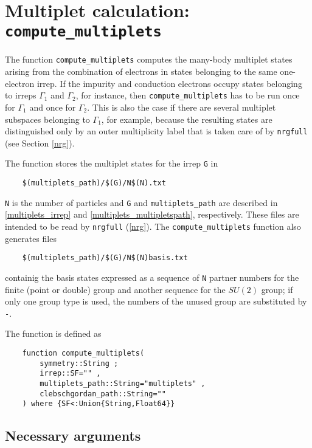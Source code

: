 \documentclass[notitlepage]{article}
\begin{document}
\section{Multiplet calculation: \texttt{compute\_multiplets}}
\label{multiplet_calculation}
The function \texttt{compute\_multiplets} computes the
many-body multiplet states arising from the combination of
electrons in states belonging to the same one-electron
irrep. If the impurity and conduction electrons occupy
states belonging to irreps $\Gamma_1$ and $\Gamma_2$, for
instance, then \texttt{compute\_multiplets} has to be run
once for $\Gamma_1$ and once for $\Gamma_2$. This is also
the case if there are several multiplet subspaces belonging
to $\Gamma_1$, for example, because the resulting states are
distinguished only by an outer multiplicity label that is
taken care of by \texttt{nrgfull} (see Section \ref{nrg}).
\par
The function stores the multiplet states for the irrep
\texttt{G} in
\begin{verbatim}
    $(multiplets_path)/$(G)/N$(N).txt
\end{verbatim}
\texttt{N} is the number of particles and \texttt{G} and
\texttt{multiplets\_path} are described in
\ref{multiplets_irrep} and \ref{multiplets_multipletspath},
respectively. These files are intended to be read by
\texttt{nrgfull} (\ref{nrg}). The
\texttt{compute\_multiplets} function also generates files 
\begin{verbatim}
    $(multiplets_path)/$(G)/N$(N)basis.txt
\end{verbatim}
containig the basis states expressed as a sequence of
\texttt{N} partner numbers for the finite (point or double)
group and another sequence for the $SU(2)$ group; if only
one group type is used, the numbers of the unused group are
substituted by \texttt{-}. 
\par
The function is defined as
\begin{verbatim}
    function compute_multiplets( 
        symmetry::String ;
        irrep::SF="" ,
        multiplets_path::String="multiplets" ,
        clebschgordan_path::String=""
    ) where {SF<:Union{String,Float64}}
\end{verbatim}
\subsection{Necessary arguments}
\end{document}
